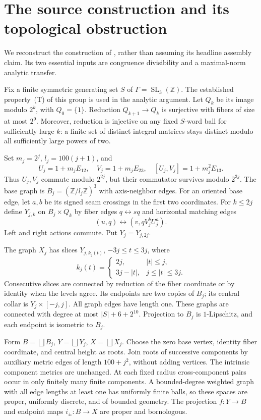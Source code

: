 \documentclass[11pt]{article}
\theoremstyle{remark}\newtheorem{remark}[theorem]{Remark}
\newcommand{\Z}{\mathbb Z}\newcommand{\Q}{\mathbb Q}\newcommand{\R}{\mathbb R}
\newcommand{\SL}{\operatorname{SL}}\newcommand{\diag}{\operatorname{diag}}
\begin{document}
\section{The source construction and its topological obstruction}
\label{sec:graph}

We reconstruct the construction of \cite{OAIcoarse}, rather than assuming
its headline assembly claim. Its two essential inputs are congruence
divisibility and a maximal-norm analytic transfer.

Fix a finite symmetric generating set $S$ of $\Gamma=\SL_3(\Z)$.
The established property~(T) of this group is used in the analytic argument.
Let $Q_k$ be its image modulo $2^k$, with $Q_0=\{1\}$.
Reduction $Q_{k+1}\to Q_k$ is surjective with fibers of size at most $2^9$.
Moreover, reduction is injective on any fixed $S$-word ball for sufficiently
large $k$: a finite set of distinct integral matrices stays distinct modulo
all sufficiently large powers of two.

Set $m_j=2^j$, $l_j=100(j+1)$, and
\[
 U_j=1+m_jE_{12},\quad V_j=1+m_jE_{23},\quad
 [U_j,V_j]=1+m_j^2E_{13}.
\]
Thus $U_j,V_j$ commute modulo $2^{2j}$, but their commutator survives modulo
$2^{3j}$. The base graph is $B_j=(\Z/l_j\Z)^3$ with axis-neighbor edges.
For an oriented base edge, let $a,b$ be its signed seam crossings in the first
two coordinates. For $k\leq2j$ define $Y_{j,k}$ on $B_j\times Q_k$ by
fiber edges $q\leftrightarrow sq$ and horizontal matching edges
\[
 (u,q)\longleftrightarrow(v,qV_j^bU_j^a).
\]
Left and right actions commute. Put $Y_j=Y_{j,2j}$.

The graph $X_j$ has slices $Y_{j,k_j(t)}$, $-3j\leq t\leq3j$, where
\[
 k_j(t)=\begin{cases}2j,&|t|\leq j,\\3j-|t|,&j\leq|t|\leq3j.\end{cases}
\]
Consecutive slices are connected by reduction of the fiber coordinate or
by identity when the levels agree. Its endpoints are two copies of $B_j$;
its central collar is $Y_j\times[-j,j]$. All graph edges have length one.
These graphs are connected with degree at most $|S|+6+2^{10}$.
Projection to $B_j$ is $1$-Lipschitz, and each endpoint is isometric to $B_j$.

Form $B=\bigsqcup B_j$, $Y=\bigsqcup Y_j$, $X=\bigsqcup X_j$. Choose the
zero base vertex, identity fiber coordinate, and central height as roots.
Join roots of successive components by auxiliary metric edges of length
$100+j^2$, without adding vertices. The intrinsic component metrics are
unchanged. At each fixed radius cross-component pairs occur in only
finitely many finite components. A bounded-degree weighted graph with all
edge lengths at least one has uniformly finite balls, so these spaces are
proper, uniformly discrete, and of bounded geometry. The projection
$f:Y\to B$ and endpoint maps $i_\pm:B\to X$ are proper and bornologous.
\end{document}
